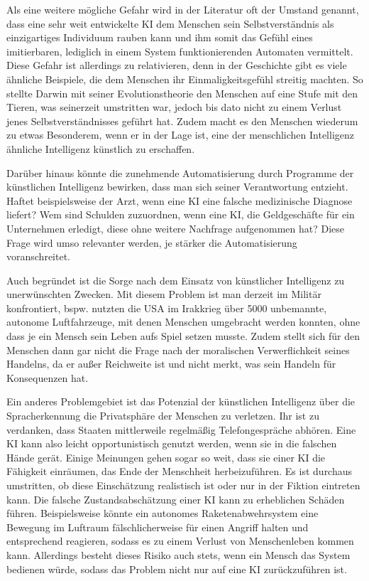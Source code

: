 Als eine weitere mögliche Gefahr wird in der Literatur oft der Umstand genannt, dass eine sehr weit entwickelte KI dem Menschen sein Selbstverständnis als einzigartiges Individuum rauben kann und ihm somit das Gefühl eines imitierbaren, lediglich in einem System funktionierenden Automaten vermittelt.
Diese Gefahr ist allerdings zu relativieren, denn in der Geschichte gibt es viele ähnliche Beispiele, die dem Menschen ihr Einmaligkeitsgefühl streitig machten.
So stellte Darwin mit seiner Evolutionstheorie den Menschen auf eine Stufe mit den Tieren, was seinerzeit umstritten war, jedoch bis dato nicht zu einem Verlust jenes Selbstverständnisses geführt hat.
Zudem macht es den Menschen wiederum zu etwas Besonderem, wenn er in der Lage ist, eine der menschlichen Intelligenz ähnliche Intelligenz künstlich zu erschaffen.

Darüber hinaus könnte die zunehmende Automatisierung durch Programme der künstlichen Intelligenz bewirken, dass man sich seiner Verantwortung entzieht.
Haftet beispielsweise der Arzt, wenn eine KI eine falsche medizinische Diagnose liefert? Wem sind Schulden zuzuordnen, wenn eine KI, die Geldgeschäfte für ein Unternehmen erledigt, diese ohne weitere Nachfrage aufgenommen hat? Diese Frage wird umso relevanter werden, je stärker die Automatisierung voranschreitet.

Auch begründet ist die Sorge nach dem Einsatz von künstlicher Intelligenz zu unerwünschten Zwecken.
Mit diesem Problem ist man derzeit im Militär konfrontiert, bspw.
nutzten die USA im Irakkrieg über 5000 unbemannte, autonome Luftfahrzeuge, mit denen Menschen umgebracht werden konnten, ohne dass je ein Mensch sein Leben aufs Spiel setzen musste.
Zudem stellt sich für den Menschen dann gar nicht die Frage nach der moralischen Verwerflichkeit seines Handelns, da er außer Reichweite ist und nicht merkt, was sein Handeln für Konsequenzen hat.

Ein anderes Problemgebiet ist das Potenzial der künstlichen Intelligenz über die Spracherkennung die Privatsphäre der Menschen zu verletzen.
Ihr ist zu verdanken, dass Staaten mittlerweile regelmäßig Telefongespräche abhören.
Eine KI kann also leicht opportunistisch genutzt werden, wenn sie in die falschen Hände gerät.
Einige Meinungen gehen sogar so weit, dass sie einer KI die Fähigkeit einräumen, das Ende der Menschheit herbeizuführen.
Es ist durchaus umstritten, ob diese Einschätzung realistisch ist oder nur in der Fiktion eintreten kann.
Die falsche Zustandsabschätzung einer KI kann zu erheblichen Schäden führen.
Beispielsweise könnte ein autonomes Raketenabwehrsystem eine Bewegung im Luftraum fälschlicherweise für einen Angriff halten und entsprechend reagieren, sodass es zu einem Verlust von Menschenleben kommen kann.
Allerdings besteht dieses Risiko auch stets, wenn ein Mensch das System bedienen würde, sodass das Problem nicht nur auf eine KI zurückzuführen ist.

